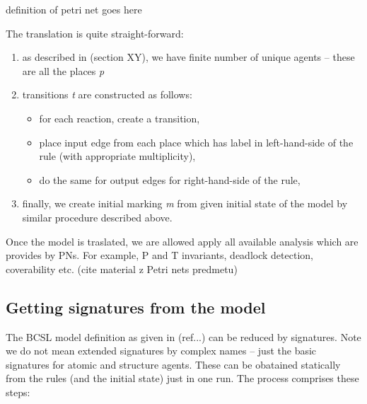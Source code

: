 \documentclass[12pt]{fithesis2}
\begin{document}
definition of petri net goes here

The translation is quite straight-forward: 

\begin{enumerate}
\item as described in (section XY), we have finite number of unique agents -- these are all the places \emph{p}
\item transitions \emph{t} are constructed as follows:
\begin{itemize}
  \item for each reaction, create a transition,
  \item place input edge from each place which has label in left-hand-side of the rule (with appropriate multiplicity),
  \item do the same for output edges for right-hand-side of the rule,
\end{itemize}
\item finally, we create initial marking \emph{m} from given initial state of the model by similar procedure described above.
\end{enumerate}

Once the model is traslated, we are allowed apply all available analysis which are provides by PNs. For example, P and T invariants, deadlock detection, coverability etc. (cite material z Petri nets predmetu)

\subsection{Getting signatures from the model}

The BCSL model definition as given in (ref...) can be reduced by signatures. Note we do not mean extended signatures by complex names -- just the basic signatures for atomic and structure agents. These can be obatained statically from the rules (and the initial state) just in one run. The process comprises these steps:
\end{document}
